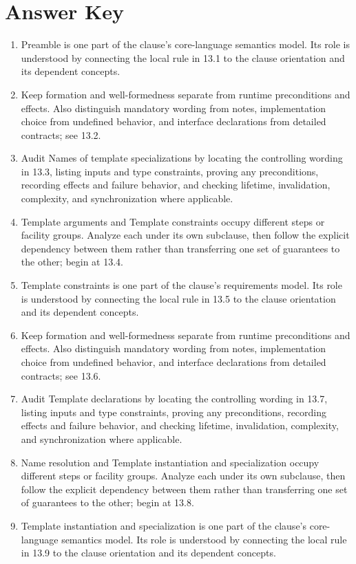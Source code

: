 \documentclass[11pt,letterpaper]{article}
\begin{document}
\clearpage\section{Answer Key}
\begin{enumerate}
\item Preamble is one part of the clause's core-language semantics model. Its role is understood by connecting the local rule in 13.1 to the clause orientation and its dependent concepts.
\item Keep formation and well-formedness separate from runtime preconditions and effects. Also distinguish mandatory wording from notes, implementation choice from undefined behavior, and interface declarations from detailed contracts; see 13.2.
\item Audit Names of template specializations by locating the controlling wording in 13.3, listing inputs and type constraints, proving any preconditions, recording effects and failure behavior, and checking lifetime, invalidation, complexity, and synchronization where applicable.
\item Template arguments and Template constraints occupy different steps or facility groups. Analyze each under its own subclause, then follow the explicit dependency between them rather than transferring one set of guarantees to the other; begin at 13.4.
\item Template constraints is one part of the clause's requirements model. Its role is understood by connecting the local rule in 13.5 to the clause orientation and its dependent concepts.
\item Keep formation and well-formedness separate from runtime preconditions and effects. Also distinguish mandatory wording from notes, implementation choice from undefined behavior, and interface declarations from detailed contracts; see 13.6.
\item Audit Template declarations by locating the controlling wording in 13.7, listing inputs and type constraints, proving any preconditions, recording effects and failure behavior, and checking lifetime, invalidation, complexity, and synchronization where applicable.
\item Name resolution and Template instantiation and specialization occupy different steps or facility groups. Analyze each under its own subclause, then follow the explicit dependency between them rather than transferring one set of guarantees to the other; begin at 13.8.
\item Template instantiation and specialization is one part of the clause's core-language semantics model. Its role is understood by connecting the local rule in 13.9 to the clause orientation and its dependent concepts.

\end{enumerate}
\end{document}

